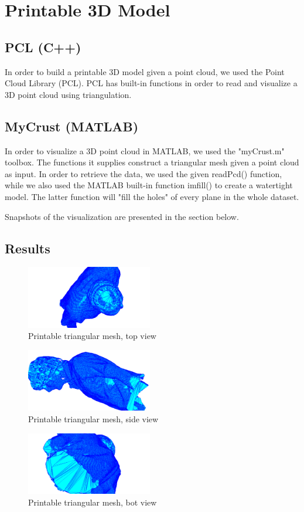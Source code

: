 \section{Printable 3D Model}

\subsection{PCL (C++)}
In order to build a printable 3D model given a point cloud, we used the Point Cloud Library (PCL)\cite{pcl}. PCL has built-in functions in order to read and visualize a 3D point cloud using triangulation. 

\subsection{MyCrust (MATLAB)}
In order to visualize a 3D point cloud in MATLAB, we used the "myCrust.m" toolbox\cite{myc}. The functions it supplies construct a triangular mesh given a point cloud as input. In order to retrieve the data, we used the given readPcd() function, while we also used the MATLAB built-in function imfill() to create a watertight model. The latter function will "fill the holes" of every plane in the whole dataset. 

Snapshots of the visualization are presented in the section below.
\subsection{Results} 


\begin{figure}[ht!]
  \centering
    \includegraphics[width=0.49\textwidth]{figures/3dMesh_sundin_zoom_top.png}
    \caption{Printable triangular mesh, top view}
    \label{fig:sundin-top-zoom}
\end{figure}

\begin{figure}[ht!]
  \centering
    \includegraphics[width=0.49\textwidth]{figures/3dMesh_sundin_zoom_side.png}
    \caption{Printable triangular mesh, side view}
    \label{fig:sundin-top-zoom}
\end{figure}

\begin{figure}[ht!]
  \centering
    \includegraphics[width=0.49\textwidth]{figures/3dMesh_sundin_zoom_bot.png}
    \caption{Printable triangular mesh, bot view}
    \label{fig:sundin-top-zoom}
\end{figure}